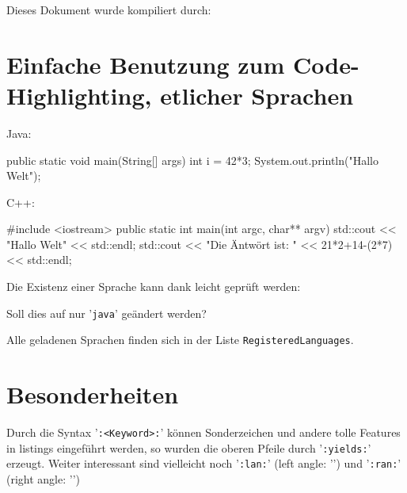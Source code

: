 \documentclass{article}
\begin{document}
\begin{bemerkung}[Kompilierung]
    Dieses Dokument wurde kompiliert durch: \begin{center}
    \end{center}
\end{bemerkung}

\section{Einfache Benutzung zum Code-Highlighting, etlicher Sprachen}
Java:
\begin{java}
public static void main(String[] args) {
    int i = 42*3;
    System.out.println("Hallo Welt");
}
\end{java}
C++:
\begin{cpp}
#include <iostream>
public static int main(int argc, char** argv) {
    std::cout << "Hallo Welt" << std::endl;
    std::cout << "Die Äntwört ist: " << 21*2+14-(2*7) << std::endl;
}
\end{cpp}
Die Existenz einer Sprache kann dank  leicht geprüft werden:
\begin{latex}
\end{latex}
\begin{bemerkung}[Notation]
    Soll dies auf nur '\verb|java|' geändert werden?
\end{bemerkung}
Alle geladenen Sprachen finden sich in der Liste \verb|RegisteredLanguages|.
\section{Besonderheiten}
Durch die Syntax '\verb|:<Keyword>:|' können Sonderzeichen und andere tolle Features in listings eingeführt werden, so wurden die oberen Pfeile durch '\verb|:yields:|' erzeugt. Weiter interessant sind vielleicht noch '\verb|:lan:|' (left angle: '') und '\verb|:ran:|' (right angle: '')
\end{document}
